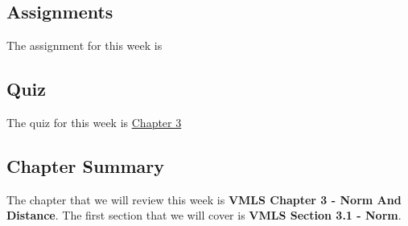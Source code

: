\subsection{Assignments}

The assignment for this week is   

\subsection{Quiz}

The quiz for this week is \href{https://applied.cs.colorado.edu/mod/quiz/view.php?id=50699}{Chapter 3} \textbullet {}  

\subsection{Chapter Summary}

The chapter that we will review this week is \textbf{VMLS Chapter 3 - Norm And Distance}. The first section that we will cover is \textbf{VMLS Section 3.1 - Norm}.

